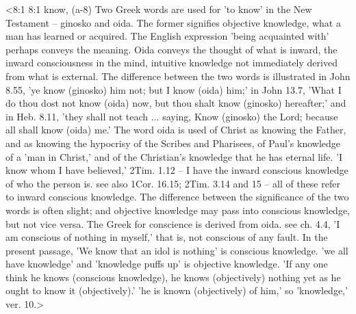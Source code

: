 <8:1 8:1  know, (a-8)  Two Greek words are used for 'to know' in the New Testament  -- ginosko and oida. The former signifies objective  knowledge, what a man has learned or acquired. The English  expression 'being acquainted with' perhaps conveys the meaning.  Oida conveys the thought of what is inward, the inward  consciousness in the mind, intuitive knowledge not immediately  derived from what is external. The difference between the two  words is illustrated in John 8.55, 'ye know (ginosko) him  not; but I know (oida) him;' in John 13.7, 'What I do thou  dost not know (oida) now, but thou shalt know (ginosko)  hereafter;' and in Heb. 8.11, 'they shall not teach ... saying,  Know (ginosko) the Lord; because all shall know (oida) me.'  The word oida is used of Christ as knowing the Father, and as  knowing the hypocrisy of the Scribes and Pharisees, of Paul's  knowledge of a 'man in Christ,' and of the Christian's  knowledge that he has eternal life. 'I know whom I have  believed,' 2Tim. 1.12 -- I have the inward conscious knowledge  of who the person is. see also 1Cor. 16.15; 2Tim. 3.14 and 15  -- all of these refer to inward conscious knowledge. The  difference between the significance of the two words is often  slight; and objective knowledge may pass into conscious  knowledge, but not vice versa. The Greek for conscience is  derived from oida. see ch. 4.4, 'I am conscious of nothing  in myself,' that is, not conscious of any fault. In the present  passage, 'We know that an idol is nothing' is conscious  knowledge. 'we all have knowledge' and 'knowledge puffs up' is  objective knowledge. 'If any one think he knows (conscious  knowledge), he knows (objectively) nothing yet as he ought to  know it (objectively).' 'he is known (objectively) of him,' so  'knowledge,' ver. 10.>
